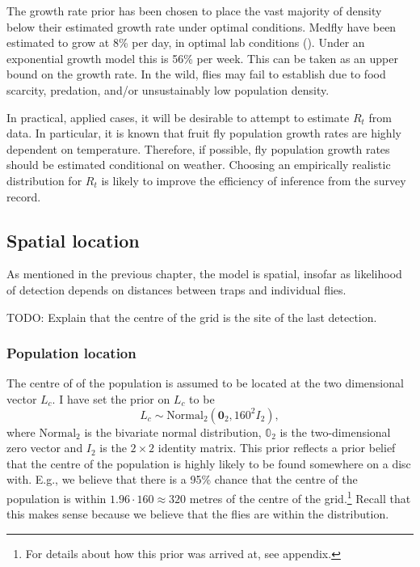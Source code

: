 \documentclass[
  oneside]{book}
\begin{document}
The growth rate prior has been chosen to place the vast majority of density below their estimated growth rate under optimal conditions. Medfly have been estimated to grow at 8\% per day, in optimal lab conditions (\citet{papadopoulos2002}). Under an exponential growth model this is 56\% per week. This can be taken as an upper bound on the growth rate. In the wild, flies may fail to establish due to food scarcity, predation, and/or unsustainably low population density.

In practical, applied cases, it will be desirable to attempt to estimate \(R_t\) from data. In particular, it is known that fruit fly population growth rates are highly dependent on temperature. Therefore, if possible, fly population growth rates should be estimated conditional on weather. Choosing an empirically realistic distribution for \(R_t\) is likely to improve the efficiency of inference from the survey record.

\hypertarget{spatial-location}{%
\subsection{Spatial location}\label{spatial-location}}

As mentioned in the previous chapter, the model is spatial, insofar as likelihood of detection depends on distances between traps and individual flies.

TODO: Explain that the centre of the grid is the site of the last detection.

\hypertarget{population-location}{%
\subsubsection{Population location}\label{population-location}}

The centre of of the population is assumed to be located at the two dimensional vector \(L_c\). I have set the prior on \(L_c\) to be
\[
L_c \sim \mathrm {Normal}_2 (\mathbf 0_2, 160^2 I_2),
\]
where \(\mathrm{Normal}_2\) is the bivariate normal distribution, \(\mathbb 0_2\) is the two-dimensional zero vector and \(I_2\) is the \(2 \times 2\) identity matrix. This prior reflects a prior belief that the centre of the population is highly likely to be found somewhere on a disc with. E.g., we believe that there is a 95\% chance that the centre of the population is within \(1.96 \cdot 160 \approx 320\) metres of the centre of the grid.\footnote{For details about how this prior was arrived at, see appendix.} Recall that this makes sense because we believe that the flies are within the distribution.
\end{document}
